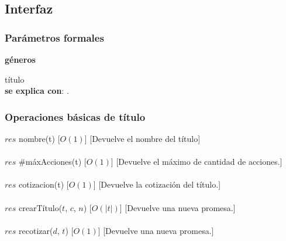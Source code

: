 \subsection{Interfaz}

  \subsubsection{Par\'ametros formales}
   \parbox{1.7cm}{\textbf{g\'eneros}} t\'itulo\\
    
  \textbf{se explica con}: .


  \subsubsection{Operaciones b\'asicas de t\'itulo}

  {$res$ \igobs nombre(t)}
  [$O(1)$]
  [Devuelve el nombre del t\'itulo]\\\\

  {$res$ \igobs \#m\'axAcciones(t)}
  [$O(1)$]
  [Devuelve el m\'aximo de cantidad de acciones.]\\\\

  {$res$ \igobs cotizacion(t)}
  [$O(1)$]
  [Devuelve la cotizaci\'on del t\'itulo.]\\\\


  {$res$ \igobs crearT\'itulo($t$, $c$, $n$)}
  [$O(|t|)$]
  [Devuelve una nueva promesa.]\\\\

  {$res$ \igobs recotizar($d$, $t$)}
  [$O(1)$]
  [Devuelve una nueva promesa.]\\\\


